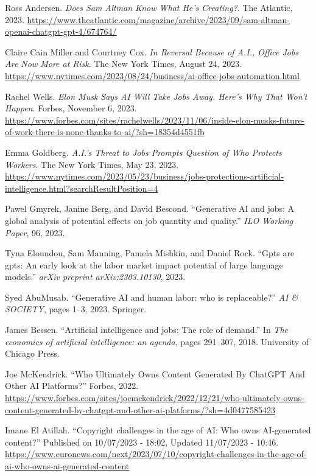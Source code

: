 \documentclass[11pt]{article}
\begin{document}
\begin{thebibliography}{9}
Ross Andersen.
\textit{Does Sam Altman Know What He’s Creating?}.
The Atlantic, 2023. 
\url{https://www.theatlantic.com/magazine/archive/2023/09/sam-altman-openai-chatgpt-gpt-4/674764/}

Claire Cain Miller and Courtney Cox.
\textit{In Reversal Because of A.I., Office Jobs Are Now More at Risk}.
The New York Times, August 24, 2023. 
\url{https://www.nytimes.com/2023/08/24/business/ai-office-jobs-automation.html}

Rachel Wells.
\textit{Elon Musk Says AI Will Take Jobs Away. Here’s Why That Won’t Happen}.
Forbes, November 6, 2023. 
\url{https://www.forbes.com/sites/rachelwells/2023/11/06/inside-elon-musks-future-of-work-there-is-none-thanks-to-ai/?sh=18354d4551fb}

Emma Goldberg.
\textit{A.I.’s Threat to Jobs Prompts Question of Who Protects Workers}.
The New York Times, May 23, 2023. 
\url{https://www.nytimes.com/2023/05/23/business/jobs-protections-artificial-intelligence.html?searchResultPosition=4}

Pawel Gmyrek, Janine Berg, and David Bescond.
``Generative AI and jobs: A global analysis of potential effects on job quantity and quality.''
\textit{ILO Working Paper}, 96, 2023.

Tyna Eloundou, Sam Manning, Pamela Mishkin, and Daniel Rock.
``Gpts are gpts: An early look at the labor market impact potential of large language models.''
\textit{arXiv preprint arXiv:2303.10130}, 2023.

Syed AbuMusab.
``Generative AI and human labor: who is replaceable?''
\textit{AI \& SOCIETY}, pages 1--3, 2023. Springer.

James Bessen.
``Artificial intelligence and jobs: The role of demand.''
In \textit{The economics of artificial intelligence: an agenda}, pages 291--307, 2018. University of Chicago Press.

Joe McKendrick.
``Who Ultimately Owns Content Generated By ChatGPT And Other AI Platforms?''
Forbes, 2022.
\url{https://www.forbes.com/sites/joemckendrick/2022/12/21/who-ultimately-owns-content-generated-by-chatgpt-and-other-ai-platforms/?sh=4d0477585423}

Imane El Atillah.
``Copyright challenges in the age of AI: Who owns AI-generated content?''
Published on 10/07/2023 - 18:02, Updated 11/07/2023 - 10:46.
\url{https://www.euronews.com/next/2023/07/10/copyright-challenges-in-the-age-of-ai-who-owns-ai-generated-content}


\end{thebibliography}
\end{document}
